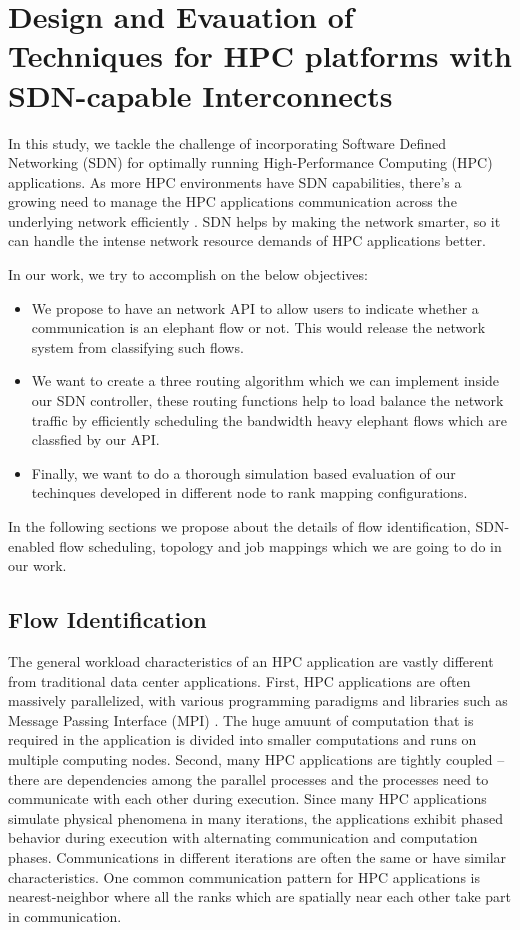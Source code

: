 \chapter{Design and Evauation of Techniques for HPC platforms with SDN-capable Interconnects} In
this study, we tackle the challenge of incorporating Software Defined
Networking (SDN) for optimally running High-Performance Computing (HPC)
applications. As more HPC environments have SDN capabilities, there's a growing
need to manage the HPC applications communication across the underlying network
efficiently \cite{kreutz2014software, alalmaei2020sdn, he2016firebird,}. 
SDN helps by making the network smarter, so it can handle
the intense network resource demands of HPC applications better. 


In our work, we try to accomplish on the below objectives:
\begin{itemize}
\item We propose to have an network API to
allow users to indicate whether a communication is an elephant flow or not. This
would release the network system from classifying such flows.

\item We want to create a three routing algorithm which we can implement inside our
SDN controller, these routing functions help to load balance the network traffic
by efficiently scheduling the bandwidth heavy elephant flows which are classfied by our API.


\item Finally, we want to do a thorough simulation based evaluation of our techinques developed
in different node to rank mapping configurations.
\end{itemize}

In the following sections we propose about the details of flow identification, SDN-enabled flow scheduling,
topology and job mappings which we are going to do in our work. 


\section{Flow Identification}
The general
workload characteristics of an HPC application are vastly different from
traditional data center applications. First, HPC applications are often
massively parallelized, with various programming paradigms and libraries such as
Message Passing Interface (MPI) \cite{forum1994mpi}. The huge amuunt of computation that is
required in the application is divided into smaller computations and runs on
multiple computing nodes. Second, many HPC applications are tightly coupled –
there are dependencies among the parallel processes and the processes need to
communicate with each other during execution. Since many HPC applications
simulate physical phenomena in many iterations, the applications exhibit phased
behavior during execution with alternating communication and computation phases.
Communications in different iterations are often the same or have similar
characteristics. One common communication pattern for HPC applications is
nearest-neighbor where all the ranks which are spatially near each other take
part in communication. 

